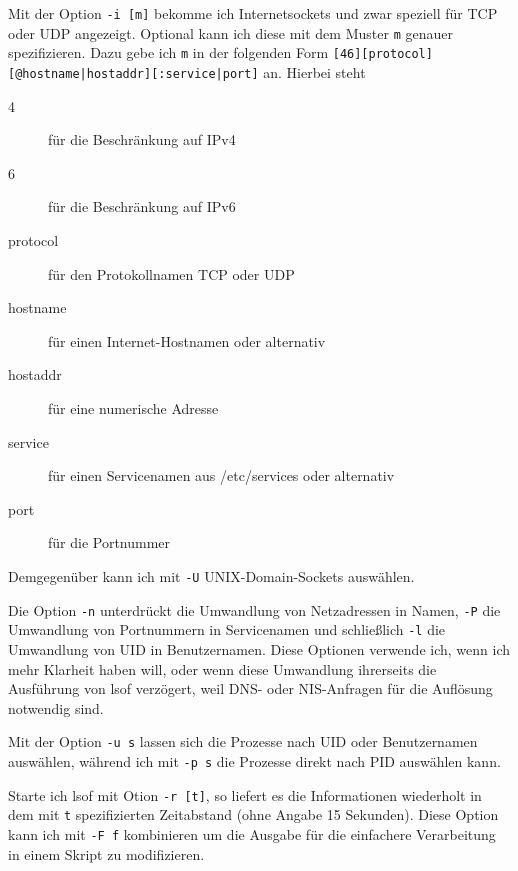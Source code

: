 \begin{normaltext}
  Mit der Option \verb?-i [m]? bekomme ich Internetsockets und zwar speziell
  für TCP oder UDP angezeigt. Optional kann ich diese mit dem Muster \verb?m?
  genauer spezifizieren. Dazu gebe ich \verb?m? in der folgenden Form
  \verb?[46][protocol][@hostname|hostaddr][:service|port]? an. Hierbei steht
  \begin{description}
    \item[4] für die Beschränkung auf IPv4
    \item[6] für die Beschränkung auf IPv6
    \item[protocol] für den Protokollnamen TCP oder UDP
    \item[hostname] für einen Internet-Hostnamen oder alternativ
    \item[hostaddr] für eine numerische Adresse
    \item[service] für einen Servicenamen aus /etc/services oder alternativ
    \item[port] für die Portnummer
  \end{description}
  Demgegenüber kann ich mit \verb?-U? UNIX-Domain-Sockets auswählen.

  Die Option \verb?-n? unterdrückt die Umwandlung von Netzadressen in Namen,
  \verb?-P? die Umwandlung von Portnummern in Servicenamen und schließlich
  \verb?-l? die Umwandlung von UID in Benutzernamen. Diese Optionen verwende
  ich, wenn ich mehr Klarheit haben will, oder wenn diese Umwandlung
  ihrerseits die Ausführung von lsof verzögert, weil DNS- oder NIS-Anfragen
  für die Auflösung notwendig sind.

  Mit der Option \verb?-u s? lassen sich die Prozesse nach UID oder
  Benutzernamen auswählen, während ich mit \verb?-p s? die Prozesse direkt
  nach PID auswählen kann.

  Starte ich lsof mit Otion \verb?-r [t]?, so liefert es die Informationen
  wiederholt in dem mit \verb?t? spezifizierten Zeitabstand (ohne Angabe 15
  Sekunden). Diese Option kann ich mit \verb?-F f? kombinieren um die Ausgabe
  für die einfachere Verarbeitung in einem Skript zu modifizieren.
\end{normaltext}

